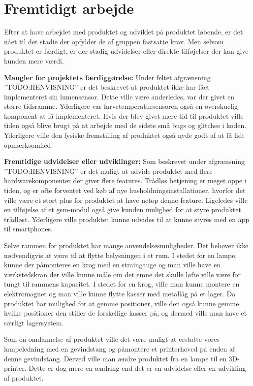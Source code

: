 \chapter{Fremtidigt arbejde}

Efter at have arbejdet med produktet og udviklet på produktet løbende, er det nået til det stadie der opfylder de af gruppen fastsatte krav. Men selvom produktet er færdigt, er der stadig udvidelser eller direkte tilføjelser der kan give kunden mere værdi.

\textbf{Mangler for projektets færdiggørelse:}
Under feltet afgrænsning ”TODO:HENVISNING” er det beskrevet at produktet ikke har fået implementeret sin lumensensor. Dette ville være anderledes, var der givet en større tidsramme. Yderligere var farvetemperatursensoren også en overskuelig komponent at få implementeret. Hvis der blev givet mere tid til produktet ville tiden også blive brugt på at arbejde med de sidste små bugs og glitches i koden. Yderligere ville den fysiske fremstilling af produktet også nyde godt af at få lidt opmærksomhed. 

\textbf{Fremtidige udvidelser eller udviklinger:}
Som beskrevet under afgrænsning ”TODO:HENVISNING” er det muligt at udvide produktet med flere hardwarekomponenter der giver flere features. Trådløs betjening er meget oppe i tiden, og er ofte forventet ved køb af nye husholdningsinstallationer, hvorfor det ville være et stort plus for produktet at have netop denne feature. Ligeledes ville en tilføjelse af et gsm-modul også give kunden mulighed for at styre produktet trådløst. Yderligere ville produktet kunne udvides til at kunne styres med en app til smartphones.

Selve rammen for produktet har mange anvendelsesmuligheder. Det behøver ikke nødvendigvis at være til at flytte belysningen i et rum. I stedet for en lampe, kunne der påmonteres en krog med en straingauge og man ville have en værkstedskran der ville kunne måle om det emne det skulle løfte ville være for tungt til rammens kapacitet. I stedet for en krog, ville man kunne montere en elektromagnet og man ville kunne flytte kasser med metallåg på et lager. Da produktet har mulighed for at gemme positioner, ville den også kunne gemme hvilke positioner den stiller de forskellige kasser på, og dermed ville man have et særligt lagersystem.

Som en omdannelse af produktet ville det være muligt at erstatte vores lampeledning med en gevindstang og påmontere et printerhoved på enden af denne gevindstang. Derved ville man ændre produktet fra en lampe til en 3D-printer. Dette er dog mere en ændring end det er en udvidelse eller en udvikling af produktet.    
